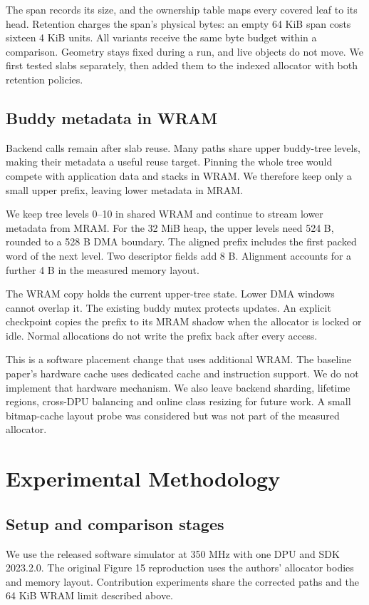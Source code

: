 \documentclass[conference]{IEEEtran}
\begin{document}
The span records its size, and the ownership table maps every covered leaf to its head. Retention charges the span's physical bytes: an empty 64 KiB span costs sixteen 4 KiB units. All variants receive the same byte budget within a comparison. Geometry stays fixed during a run, and live objects do not move. We first tested slabs separately, then added them to the indexed allocator with both retention policies.

\subsection{Buddy metadata in WRAM}
Backend calls remain after slab reuse. Many paths share upper buddy-tree levels, making their metadata a useful reuse target. Pinning the whole tree would compete with application data and stacks in WRAM. We therefore keep only a small upper prefix, leaving lower metadata in MRAM.

We keep tree levels 0--10 in shared WRAM and continue to stream lower metadata from MRAM. For the 32 MiB heap, the upper levels need 524 B, rounded to a 528 B DMA boundary. The aligned prefix includes the first packed word of the next level. Two descriptor fields add 8 B. Alignment accounts for a further 4 B in the measured memory layout.

The WRAM copy holds the current upper-tree state. Lower DMA windows cannot overlap it. The existing buddy mutex protects updates. An explicit checkpoint copies the prefix to its MRAM shadow when the allocator is locked or idle. Normal allocations do not write the prefix back after every access.

This is a software placement change that uses additional WRAM. The baseline paper's hardware cache uses dedicated cache and instruction support. We do not implement that hardware mechanism. We also leave backend sharding, lifetime regions, cross-DPU balancing and online class resizing for future work. A small bitmap-cache layout probe was considered but was not part of the measured allocator.

\section{Experimental Methodology}
\subsection{Setup and comparison stages}
We use the released software simulator at 350 MHz with one DPU and SDK 2023.2.0. The original Figure 15 reproduction uses the authors' allocator bodies and memory layout. Contribution experiments share the corrected paths and the 64 KiB WRAM limit described above.
\end{document}

